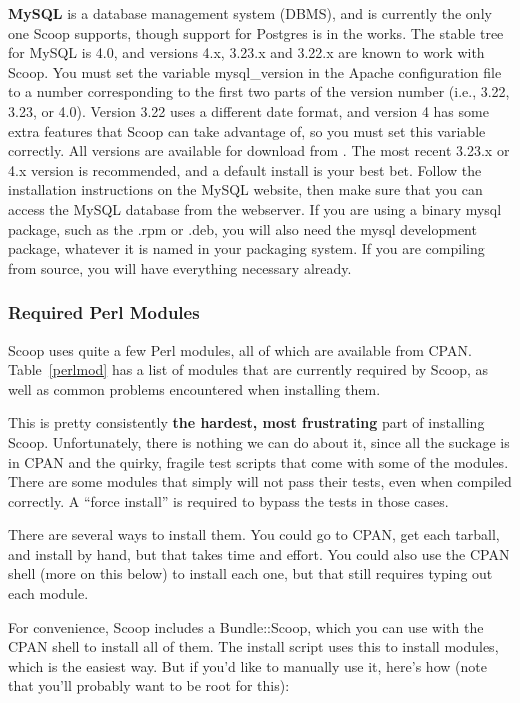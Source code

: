 {\bf MySQL} is a database management system (DBMS), and is currently the only one Scoop supports, though support for Postgres is in the works. The stable tree for MySQL is 4.0, and versions 4.x, 3.23.x and 3.22.x are known to work with Scoop.  You must set the variable mysql\_version in the Apache configuration file to a number corresponding to the first two parts of the version number (i.e., 3.22, 3.23, or 4.0).  Version 3.22 uses a different date format, and version 4 has some extra features that Scoop can take advantage of, so you must set this variable correctly.  All versions are available for download from .  The most recent 3.23.x or 4.x version is recommended, and a default install is your best bet.  Follow the installation instructions on the MySQL website, then make sure that you can access the MySQL database from the webserver.  If you are using a binary mysql package, such as the .rpm or .deb, you will also need the mysql development package, whatever it is named in your packaging system.  If you are compiling from source, you will have everything necessary already.

\subsubsection{Required Perl Modules}
\label{install-modules}

Scoop uses quite a few Perl modules, all of which are available from CPAN. Table~\ref{perlmod} has a list of modules that are currently required by Scoop, as well as common problems encountered when installing them.

This is pretty consistently {\bf the hardest, most frustrating} part of installing Scoop.  Unfortunately, there is nothing we can do about it, since all the suckage is in CPAN and the quirky, fragile test scripts that come with some of the modules.  There are some modules that simply will not pass their tests, even when compiled correctly.  A ``force install'' is required to bypass the tests in those cases.

There are several ways to install them. You could go to CPAN, get each tarball, and install by hand, but that takes time and effort. You could also use the CPAN shell (more on this below) to install each one, but that still requires typing out each module.

For convenience, Scoop includes a Bundle::Scoop, which you can use with the CPAN shell to install all of them.  The install script uses this to install modules, which is the easiest way. But if you'd like to manually use it, here's how (note that you'll probably want to be root for this):

